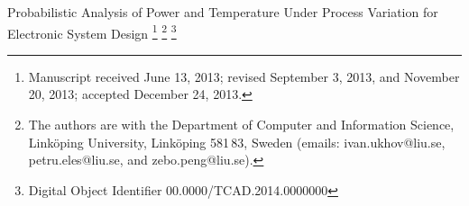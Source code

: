 {\TitleFont Probabilistic Analysis of Power and Temperature Under Process Variation for Electronic System Design}%
\thanks{Manuscript received June 13, 2013; revised September 3, 2013, and November 20, 2013; accepted December 24, 2013.}%
\thanks{The authors are with the Department of Computer and Information Science, Link\"{o}ping University, Link\"{o}ping 581\,83, Sweden (emails: ivan.ukhov@liu.se, petru.eles@liu.se, and zebo.peng@liu.se).}%
\thanks{Digital Object Identifier 00.0000/TCAD.2014.0000000}
